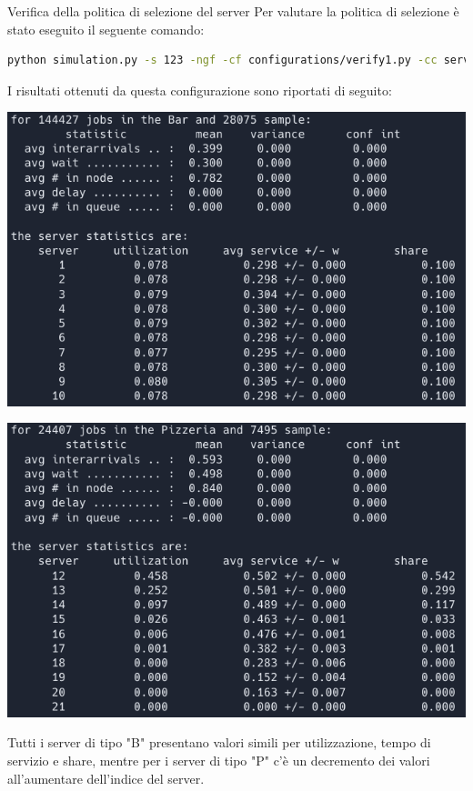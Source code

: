 \documentclass[xcolor=table]{beamer}
\begin{document}
\begin{frame}[fragile]{Verifica della politica di selezione del server}\justifying
Per valutare la politica di selezione è stato eseguito il seguente comando:
\begin{lstlisting}[language=Bash, numbers=none, ]
python simulation.py -s 123 -ngf -cf configurations/verify1.py -cc servers_b 10 -cc servers_p 10
\end{lstlisting}

I risultati ottenuti da questa configurazione sono riportati di seguito:
\vspace*{0.1ex}
	
\hspace*{\fill}
\begin{minipage}{0.4\textwidth}
\includegraphics[width=\textwidth]{rho_services_b}
\end{minipage}
\hfill
\begin{minipage}{0.4\textwidth}
\includegraphics[width=\textwidth]{rho_services_p}
\end{minipage}
\hspace*{\fill}
\bigskip

Tutti i server di tipo "B" presentano valori simili per utilizzazione, tempo di servizio e share, mentre per i server di tipo "P" c'è un decremento dei valori all'aumentare dell'indice del server.
\end{frame}
\end{document}
